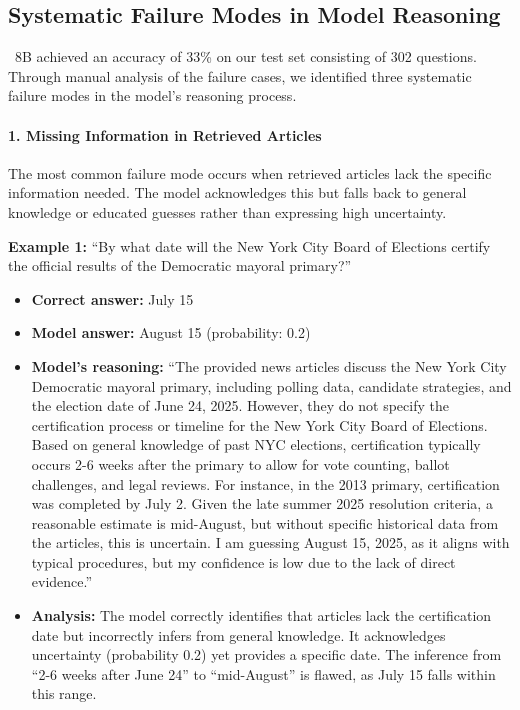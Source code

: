 \subsection{Systematic Failure Modes in Model Reasoning}

\ourmodel \ 8B achieved an accuracy of 33\% on our test set consisting of 302 questions. Through manual analysis of the failure cases, we identified three systematic failure modes in the model's reasoning process.

\paragraph{1. Missing Information in Retrieved Articles}

The most common failure mode occurs when retrieved articles lack the specific information needed. The model acknowledges this but falls back to general knowledge or educated guesses rather than expressing high uncertainty.

\textbf{Example 1:} ``By what date will the New York City Board of Elections certify the official results of the Democratic mayoral primary?''

\begin{itemize}
\item \textbf{Correct answer:} July 15
\item \textbf{Model answer:} August 15 (probability: 0.2)
\item \textbf{Model's reasoning:} ``The provided news articles discuss the New York City Democratic mayoral primary, including polling data, candidate strategies, and the election date of June 24, 2025. However, they do not specify the certification process or timeline for the New York City Board of Elections. Based on general knowledge of past NYC elections, certification typically occurs 2-6 weeks after the primary to allow for vote counting, ballot challenges, and legal reviews. For instance, in the 2013 primary, certification was completed by July 2. Given the late summer 2025 resolution criteria, a reasonable estimate is mid-August, but without specific historical data from the articles, this is uncertain. I am guessing August 15, 2025, as it aligns with typical procedures, but my confidence is low due to the lack of direct evidence.''
\item \textbf{Analysis:} The model correctly identifies that articles lack the certification date but incorrectly infers from general knowledge. It acknowledges uncertainty (probability 0.2) yet provides a specific date. The inference from ``2-6 weeks after June 24'' to ``mid-August'' is flawed, as July 15 falls within this range.
\end{itemize}

